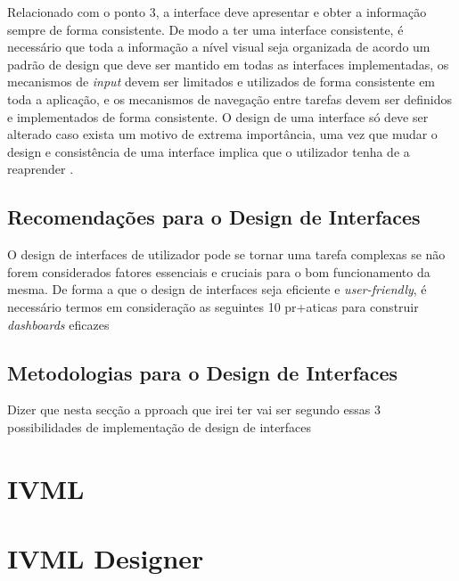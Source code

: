 Relacionado com o ponto 3, a interface deve apresentar e obter a informação sempre de forma consistente. De modo a ter uma interface consistente, é necessário que toda a informação a nível visual seja organizada de acordo um padrão de design que deve ser mantido em todas as interfaces implementadas, os mecanismos de \textit{input} devem ser limitados e utilizados de forma consistente em toda a aplicação, e os mecanismos de navegação entre tarefas devem ser definidos e implementados de forma consistente. O design de uma interface só deve ser alterado caso exista um motivo de extrema importância, uma vez que mudar o design e consistência de uma interface implica que o utilizador tenha de a reaprender \cite{sridevi2014user}.

\subsection{Recomendações para o Design de Interfaces} %
\label{sub:recomendacoes}

O design de interfaces de utilizador pode se tornar uma tarefa complexas se não forem considerados fatores essenciais e cruciais para o bom funcionamento da mesma. De forma a que o design de interfaces seja eficiente e \textit{user-friendly}, é necessário termos em consideração as seguintes 10 pr+aticas para construir \textit{dashboards} eficazes


\subsection{Metodologias para o Design de Interfaces} %
\label{sub:metodologias}

Dizer que nesta secção a pproach que irei ter vai ser segundo essas 3 possibilidades de implementação de design de interfaces



\section{IVML}
\label{sec:ivml}


\section{IVML Designer}
\label{sec:ivml_designer}


